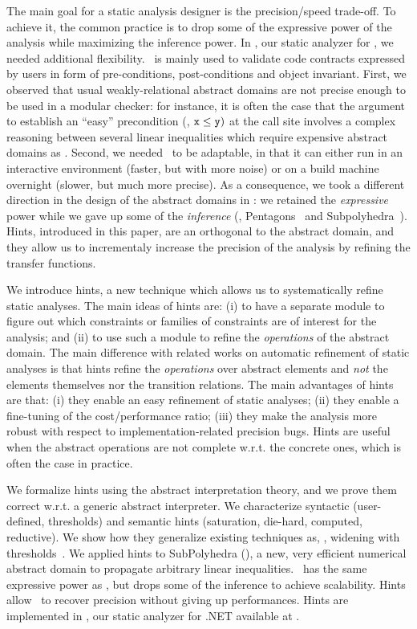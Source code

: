 \documentclass{llncs}
\begin{document}
The main goal for  a static analysis designer is the precision/speed
trade-off.
To achieve it, the common practice  is to drop some of the expressive power of the
analysis while maximizing the inference power.
In  \Clousot, our static analyzer for \NET, we needed additional flexibility. 
\Clousot\ is mainly used to validate code contracts expressed by users
in form of pre-conditions, post-conditions and object invariant.
First, we observed that usual weakly-relational abstract domains are
not precise enough to be used in a modular checker: for instance, it is often the
case that the argument to establish an ``easy'' precondition (\eg,
$\mathtt{x} \leq \mathtt{y})$ at the call site involves a complex reasoning between several
linear inequalities which require expensive abstract domains as \Poly.
Second, we needed \Clousot\ to be adaptable, in that it can either run
in an interactive environment (faster, but with more noise) or on a
build machine overnight (slower, but much more precise).
As a consequence, we took a different direction in the design of the
abstract domains in \Clousot: we retained the \emph{expressive} power
while we gave up some of the \emph{inference} (\eg, Pentagons~\cite{LogozzoMaf08}
and Subpolyhedra~\cite{LavironLogozzo09}).
Hints, introduced in this paper, are an orthogonal to the abstract
domain, and they allow us to incrementaly increase the precision of the
analysis by refining the transfer functions.


We introduce hints, a new technique which allows us to systematically refine static analyses.
The main ideas of hints are: (i) to have a separate module to figure out which constraints or families of constraints are of interest for the analysis; and (ii) to use such a module to refine the \emph{operations} of the abstract domain.
The main difference with related works on automatic refinement of static analyses is that hints refine the \emph{operations} over abstract elements and \emph{not} the elements themselves nor the transition relations.
The main advantages of hints are that: 
(i) they enable an easy refinement of static analyses; 
(ii) they enable a fine-tuning of the cost/performance ratio;  
(iii) they make the analysis more robust with respect to implementation-related precision bugs.  
Hints are useful when the abstract operations are not complete w.r.t. the concrete ones, which is often the case in practice.

We formalize hints using the abstract interpretation theory, and we
prove them correct w.r.t. a generic abstract interpreter. 
We characterize syntactic (user-defined, thresholds)  and
semantic hints (saturation, die-hard, computed, reductive).
We show how they generalize existing techniques as, \eg, widening with
thresholds~\cite{BlanchetCousotEtAl03}.
We applied hints to SubPolyhedra (\Subpoly), a new, very efficient
numerical abstract domain to propagate  arbitrary linear inequalities.
\Subpoly\ has the same expressive power as \Poly, but drops some of the inference to achieve scalability.
Hints allow \Subpoly\ to recover precision without giving up performances.
Hints are implemented in \Clousot, our static analyzer for .NET
available at \cite{CodeContracts}.
\end{document}
